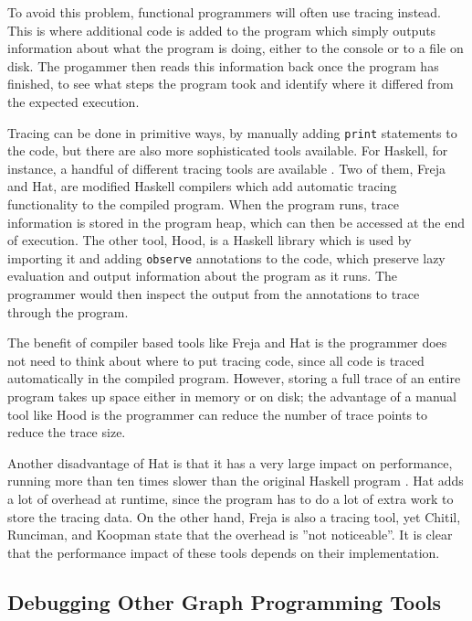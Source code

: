 \documentclass[authoryearcitations]{UoYCSproject}
\begin{document}
To avoid this problem, functional programmers will often use tracing instead.
This is where additional code is added to the program which simply outputs
information about what the program is doing, either to the console or to a file on
disk. The progammer then reads this information back once the program has finished,
to see what steps the program took and identify where it differed from the
expected execution.

Tracing can be done in primitive ways, by manually adding \texttt{print}
statements to the code, but there are also more sophisticated tools available.
For Haskell, for instance, a handful of different tracing tools are
available \citep{runciman2000}. Two of them, Freja and Hat, are modified Haskell
compilers which add automatic tracing functionality to the compiled program. When
the program runs, trace information is stored in the program heap, which can then
be accessed at the end of execution. The other tool, Hood, is a Haskell library
which is used by importing it and adding \texttt{observe} annotations to the code,
which preserve lazy evaluation and output information about the program as it runs.
The programmer would then inspect the output from the annotations to trace through
the program.

The benefit of compiler based tools like Freja and Hat is the programmer does not
need to think about where to put tracing code, since all code is traced automatically
in the compiled program. However, storing a full trace of an entire program takes
up space either in memory or on disk; the advantage of a manual tool like Hood is
the programmer can reduce the number of trace points to reduce the trace size.

Another disadvantage of Hat is that it has a very large impact on performance,
running more than ten times slower than the original Haskell program \citep{runciman2000}.
Hat adds a lot of overhead at runtime, since the program has to do a lot of
extra work to store the tracing data. On the other hand, Freja is also a tracing
tool, yet Chitil, Runciman, and Koopman state that the overhead is ''not
noticeable''. It is clear that the performance impact of these tools depends on
their implementation.


\subsection{Debugging Other Graph Programming Tools}
\label{sec:DebuggingOtherGraphProgrammingTools}
\end{document}
